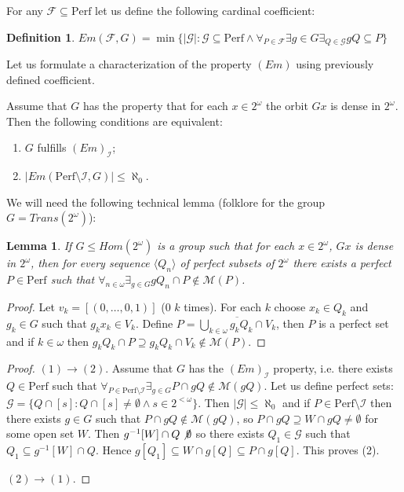 \documentclass[b5cutpaper, twoside, 11pt, leqno]{moravica}
\newcommand{\calF}{\mathcal{F}}
\newcommand{\calG}{\mathcal{G}}
\newcommand{\calI}{\mathcal{I}}
\newcommand\trans{\mathit{Trans}(\ca)}
\newcommand{\ca}{2^{\omega}}
\newcommand{\cantor}{\ca}
\newcommand{\Perf}{\mathrm{Perf}}
\newcommand{\meager}{\mathcal{M}}
\newtheorem{lemma}{Lemma}[section]
\theoremstyle{definition}
\newtheorem{definition}{Definition}[section]
\begin{document}
  For any $\calF \subseteq \Perf$ 
let us define the following cardinal coefficient:
\begin{definition}
$Em(\calF, G) = \min\{|\calG|\colon \calG\subseteq \Perf \wedge 
\forall_{P\in\calF} \exists{g\in G} \exists_{Q\in\calG} gQ \subseteq P\}$
\end{definition}

  Let us formulate a characterization of the property 
$(Em)$ using previously defined coefficient.

Assume that $G$ has the property that for each $x\in\cantor$
the orbit $Gx$ is dense in $\cantor$.
Then the following conditions are equivalent:

\begin{enumerate}
\item
  $G$ fulfills $(Em)_{\calI}$; 
\item
  $|Em(\Perf\setminus \calI, G) | \leq \aleph_0$.
\end{enumerate}

  We will need the following technical lemma
(folklore for the group $G = \trans$):
\begin{lemma}\label{lemma-dense}
If $G\leq Hom(\cantor)$ is a group such that for each 
$x\in\cantor$, $Gx$ is dense in $\cantor$,
then for every sequence $\langle Q_n\rangle$
of perfect subsets of $\cantor$ there exists
a perfect $P\in\Perf$ such that 
$\forall_{n\in\omega} \exists_{g\in G} gQ_n \cap P 
\not \in \meager(P)$.
\end{lemma}
\begin{proof}
Let $v_k = [(0,\ldots,0, 1)]$ ($0$ $k$ times).
For each $k$ choose $x_k\in Q_k$ and $g_k\in G$
such that $g_k x_k \in V_k$. Define
$P = \overline{\bigcup_{k\in\omega}g_k Q_k \cap V_k}$,
then $P$ is a perfect set and if $k\in\omega$
then 
$g_k Q_k \cap P \supseteq g_k Q_k \cap V_k \not\in \meager(P)$.
\end{proof}

\begin{proof}%
$(1)\to (2)$.
Assume that $G$ has the $(Em)_\calI$ property,
i.e. there exists $Q\in\Perf$ such that
$\forall_{P\in\Perf\setminus\calI}\exists_{g\in G} 
P\cap gQ\not\in \meager(gQ)$. 
Let us define perfect sets:
$\calG = \{Q \cap [s] \colon Q \cap [s] \not= \emptyset \wedge
s\in 2^{<\omega}\}$.
Then $|\calG| \leq \aleph_0$ and if $P\in\Perf\setminus\calI$
then there exists $g\in G$ such that
$P\cap gQ \not\in\meager(gQ)$, so
$P\cap gQ \supseteq W\cap gQ \not= \emptyset$
for some open set $W$.
Then $g^{-1}[W] \cap Q \not\emptyset$
so there exists $Q_1\in \calG$ such that
$Q_1 \subseteq g^{-1}[W] \cap Q$.
Hence $g[Q_1] \subseteq W \cap g[Q] \subseteq P \cap g[Q]$.
This proves (2).

$(2)\to(1)$.

\end{proof}
\end{document}
